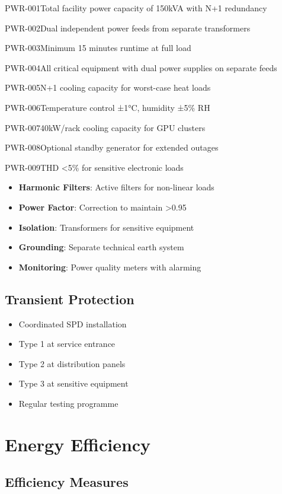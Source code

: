 \begin{requirement}{PWR-001}{Total facility power capacity of 150kVA with N+1 redundancy}
\begin{requirement}{PWR-002}{Dual independent power feeds from separate transformers}
\begin{requirement}{PWR-003}{Minimum 15 minutes runtime at full load}
\begin{requirement}{PWR-004}{All critical equipment with dual power supplies on separate feeds}
\begin{requirement}{PWR-005}{N+1 cooling capacity for worst-case heat loads}
\begin{requirement}{PWR-006}{Temperature control ±1°C, humidity ±5\% RH}
\begin{requirement}{PWR-007}{40kW/rack cooling capacity for GPU clusters}
\begin{requirement}{PWR-008}{Optional standby generator for extended outages}
\begin{requirement}{PWR-009}{THD <5\% for sensitive electronic loads}
\begin{itemize}
    \item \textbf{Harmonic Filters}: Active filters for non-linear loads
    \item \textbf{Power Factor}: Correction to maintain >0.95
    \item \textbf{Isolation}: Transformers for sensitive equipment
    \item \textbf{Grounding}: Separate technical earth system
    \item \textbf{Monitoring}: Power quality meters with alarming
\end{itemize}

\subsection{Transient Protection}

\begin{itemize}
    \item Coordinated SPD installation
    \item Type 1 at service entrance
    \item Type 2 at distribution panels
    \item Type 3 at sensitive equipment
    \item Regular testing programme
\end{itemize}

\section{Energy Efficiency}

\subsection{Efficiency Measures}


\end{requirement}
\end{requirement}
\end{requirement}
\end{requirement}
\end{requirement}
\end{requirement}
\end{requirement}
\end{requirement}
\end{requirement}
